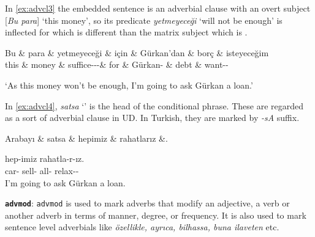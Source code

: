 \documentclass[11pt,a4paper]{article}
\begin{document}
In \autoref{ex:advcl3} the embedded sentence is an adverbial clause with an overt subject [\textit{Bu para}] `this money', so its predicate \textit{yetmeyeceği} `will not be enough' is inflected for {\Tsg} which is different than the matrix subject which is {\Fsg}.

\begin{exe}
\ex \label{ex:advcl3}
\begin{dependency}
\begin{deptext}[column sep=0.32cm]
Bu \& para \& yetmeyeceği \& için \& Gürkan'dan \& borç \& isteyeceğim \\
this \& money \& suffice-\Neg{}-\Ptcp{}-\Tsg \& for \& Gürkan-\Abl{} \& debt \& want-\Fut{}-\Fsg{} \\
\end{deptext}
\end{dependency}
\glt `As this money won’t be enough, I’m going to ask Gürkan a loan.'
\end{exe}

In \autoref{ex:advcl4},  \textit{satsa} `' is the head of the conditional phrase. These are regarded as a sort of adverbial clause in UD. In Turkish, they are marked by \textit{-sA} suffix.

\begin{exe}
\ex \label{ex:advcl4}
\begin{dependency}
\begin{deptext}[column sep=0.32cm]
Arabayı \& satsa \& hepimiz \& rahatlarız \&. \\
\end{deptext}
\end{dependency}
 hep-imiz rahatla-r-ız.  \\
car-\Acc{} sell-\Cond{} all-\Fpl{} relax-\Prs{}-\Fpl{} \\
 I’m going to ask Gürkan a loan.
\end{exe}



\textbf{\texttt{advmod}}:
\texttt{advmod} is used to mark adverbs that modify an adjective, a verb or another adverb in terms of manner, degree, or frequency. It is also used to mark sentence level adverbials like \textit{özellikle, ayrıca, bilhassa, buna ilaveten} etc.
\end{document}
